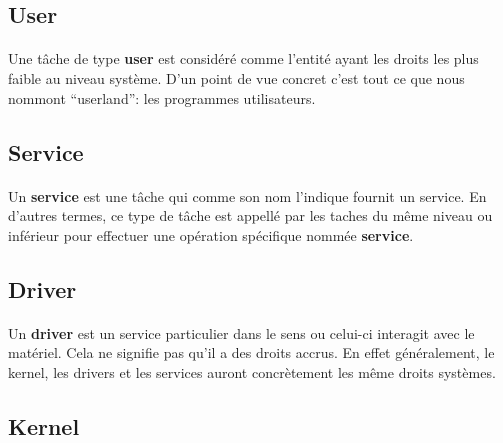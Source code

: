 \documentclass[10pt,a4wide]{article}
\begin{document}
\subsection{User}

\paragraph{}

Une t\^ache de type \textbf{user} est consid\'er\'e comme l'entit\'e ayant
les droits les plus faible au niveau syst\`eme. D'un point de vue concret
c'est tout ce que nous nommont ``userland'': les programmes utilisateurs.

\subsection{Service}

\paragraph{}

Un \textbf{service} est une t\^ache qui comme son nom l'indique fournit
un service. En d'autres termes, ce type de t\^ache est appell\'e par
les taches du m\^eme niveau ou inf\'erieur pour effectuer une op\'eration
sp\'ecifique nomm\'ee \textbf{service}.

\subsection{Driver}

\paragraph{}

Un \textbf{driver} est un service particulier dans le sens ou celui-ci
interagit avec le mat\'eriel. Cela ne signifie pas qu'il a des droits
accrus. En effet g\'en\'eralement, le kernel, les drivers et les services
auront concr\`etement les m\^eme droits syst\`emes.

\subsection{Kernel}

\paragraph{}
\end{document}
